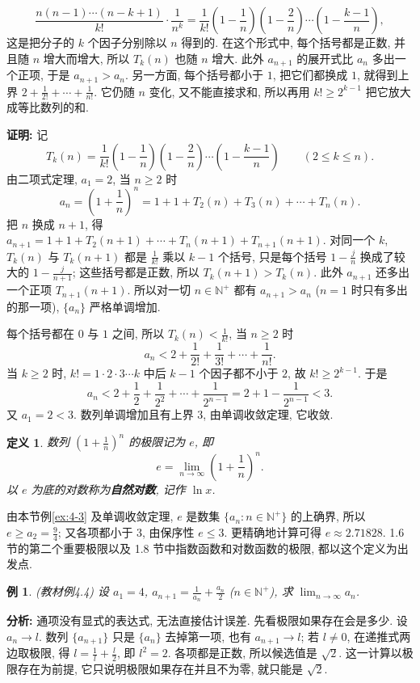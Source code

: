 \documentclass[UTF8,openany]{ctexbook}
\theoremstyle{chinesetextbook}
\newtheorem{definition}{定义}[section]
\newtheorem{example}{例}[section]
\newenvironment{cnproof}{\par\indent\textbf{证明:} \ignorespaces}{\par}
\begin{document}
\[
\frac{n(n-1)\cdots(n-k+1)}{k!}\cdot\frac1{n^k}=\frac1{k!}\left(1-\frac1n\right)\left(1-\frac2n\right)\cdots\left(1-\frac{k-1}n\right),
\]
这是把分子的 $k$ 个因子分别除以 $n$ 得到的. 在这个形式中, 每个括号都是正数, 并且随 $n$ 增大而增大, 所以 $T_k(n)$ 也随 $n$ 增大. 此外 $a_{n+1}$ 的展开式比 $a_n$ 多出一个正项, 于是 $a_{n+1}>a_n$. 另一方面, 每个括号都小于 $1$, 把它们都换成 $1$, 就得到上界 $\displaystyle2+\frac1{2!}+\cdots+\frac1{n!}$. 它仍随 $n$ 变化, 又不能直接求和, 所以再用 $k!\ge2^{k-1}$ 把它放大成等比数列的和.
\begin{cnproof}
记
\[
T_k(n)=\frac1{k!}\left(1-\frac1n\right)\left(1-\frac2n\right)\cdots\left(1-\frac{k-1}n\right)\qquad(2\le k\le n).
\]
由二项式定理, $a_1=2$, 当 $n\ge2$ 时
\[
a_n=\left(1+\frac1n\right)^n=1+1+T_2(n)+T_3(n)+\cdots+T_n(n).
\]
把 $n$ 换成 $n+1$, 得 $a_{n+1}=1+1+T_2(n+1)+\cdots+T_n(n+1)+T_{n+1}(n+1)$. 对同一个 $k$, $T_k(n)$ 与 $T_k(n+1)$ 都是 $\displaystyle\frac1{k!}$ 乘以 $k-1$ 个括号, 只是每个括号 $\displaystyle1-\frac jn$ 换成了较大的 $\displaystyle1-\frac j{n+1}$; 这些括号都是正数, 所以 $T_k(n+1)>T_k(n)$. 此外 $a_{n+1}$ 还多出一个正项 $T_{n+1}(n+1)$. 所以对一切 $n\in\mathbb N^+$ 都有 $a_{n+1}>a_n$ ($n=1$ 时只有多出的那一项), $\{a_n\}$ 严格单调增加.

每个括号都在 $0$ 与 $1$ 之间, 所以 $\displaystyle T_k(n)<\frac1{k!}$, 当 $n\ge2$ 时
\[
a_n<2+\frac1{2!}+\frac1{3!}+\cdots+\frac1{n!}.
\]
当 $k\ge2$ 时, $k!=1\cdot2\cdot3\cdots k$ 中后 $k-1$ 个因子都不小于 $2$, 故 $k!\ge2^{k-1}$. 于是
\[
a_n<2+\frac12+\frac1{2^2}+\cdots+\frac1{2^{n-1}}=2+1-\frac1{2^{n-1}}<3.
\]
又 $a_1=2<3$. 数列单调增加且有上界 $3$, 由单调收敛定理, 它收敛.
\end{cnproof}
\begin{definition}
数列 $\displaystyle\left(1+\frac1n\right)^n$ 的极限记为 $e$, 即
\[
e=\lim_{n\to\infty}\left(1+\frac1n\right)^n.
\]
以 $e$ 为底的对数称为\textbf{自然对数}, 记作 $\ln x$.
\end{definition}
由本节例\ref{ex:4-3} 及单调收敛定理, $e$ 是数集 $\{a_n:n\in\mathbb N^+\}$ 的上确界, 所以 $\displaystyle e\ge a_2=\frac94$; 又各项都小于 $3$, 由保序性 $e\le3$. 更精确地计算可得 $e\approx2.71828$. 1.6 节的第二个重要极限以及 1.8 节中指数函数和对数函数的极限, 都以这个定义为出发点.
\begin{example}\label{ex:4-4}
\textnormal{(教材例4.4)} 设 $a_1=4$, $\displaystyle a_{n+1}=\frac1{a_n}+\frac{a_n}2$ ($n\in\mathbb N^+$), 求 $\displaystyle\lim_{n\to\infty}a_n$.
\end{example}
\par\indent\textbf{分析:} 通项没有显式的表达式, 无法直接估计误差. 先看极限如果存在会是多少. 设 $a_n\to l$. 数列 $\{a_{n+1}\}$ 只是 $\{a_n\}$ 去掉第一项, 也有 $a_{n+1}\to l$; 若 $l\ne0$, 在递推式两边取极限, 得 $\displaystyle l=\frac1l+\frac l2$, 即 $l^2=2$. 各项都是正数, 所以候选值是 $\sqrt2$. 这一计算以极限存在为前提, 它只说明极限如果存在并且不为零, 就只能是 $\sqrt2$.
\end{document}
